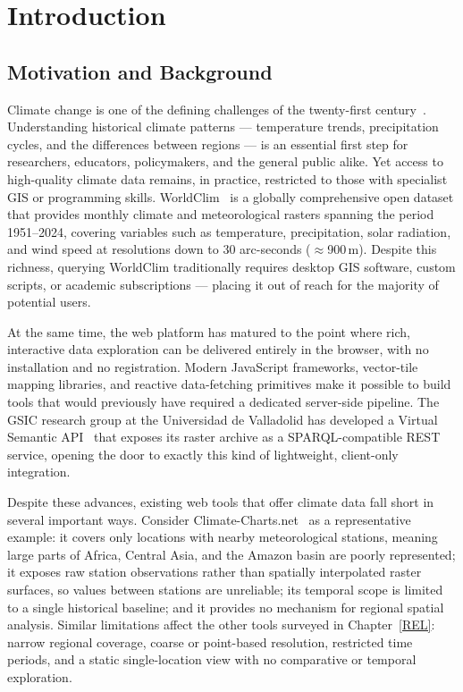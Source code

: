 \chapter{Introduction}\label{INTRO}

\section{Motivation and Background}\label{INTRO_MOT}

Climate change is one of the defining challenges of the twenty-first
century~\cite{unesco_sdgs}. Understanding historical climate patterns ---
temperature trends, precipitation cycles, and the differences between regions
--- is an essential first step for researchers, educators, policymakers, and
the general public alike. Yet access to high-quality climate data remains, in
practice, restricted to those with specialist GIS or programming skills.
WorldClim~\cite{fick2017worldclim} is a globally comprehensive open dataset
that provides monthly climate and meteorological rasters spanning the period
1951--2024, covering variables such as temperature, precipitation, solar
radiation, and wind speed at resolutions down to 30 arc-seconds
($\approx$900\,m). Despite this richness, querying WorldClim traditionally
requires desktop GIS software, custom scripts, or academic subscriptions ---
placing it out of reach for the majority of potential users.

At the same time, the web platform has matured to the point where rich,
interactive data exploration can be delivered entirely in the browser, with no
installation and no registration. Modern JavaScript frameworks, vector-tile
mapping libraries, and reactive data-fetching primitives make it possible to
build tools that would previously have required a dedicated server-side
pipeline. The GSIC research group at the Universidad de Valladolid has developed a
Virtual Semantic API~\cite{scrapi} that exposes its raster archive as a
SPARQL-compatible REST service, opening the door to exactly this kind of
lightweight, client-only integration.

Despite these advances, existing web tools that offer climate data fall short
in several important ways. Consider Climate-Charts.net~\cite{climatecharts} as
a representative example: it covers only locations with nearby meteorological
stations, meaning large parts of Africa, Central Asia, and the Amazon basin are
poorly represented; it exposes raw station observations rather than
spatially interpolated raster surfaces, so values between stations are
unreliable; its temporal scope is limited to a single historical baseline; and
it provides no mechanism for regional spatial analysis. Similar limitations
affect the other tools surveyed in Chapter~\ref{REL}: narrow regional coverage,
coarse or point-based resolution, restricted time periods, and a static
single-location view with no comparative or temporal exploration.

